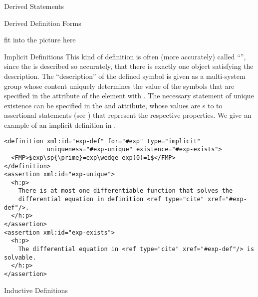 \begin{omgroup}{Derived Statements}
\begin{module}[id=derived-defs]
\begin{omgroup}[short=Derived Definitions]{Derived Definition Forms}
\begin{oldpart}{fit into the picture here}
\begin{module}[id=implicit-defs]
\begin{omgroup}{Implicit Definitions}
This kind of definition is often (more accurately) called ``{\emph{}}'', since the {} is described so accurately,
that there is exactly one object satisfying the description. The ``description'' of the
defined symbol is given as a multi-system  group whose content uniquely
determines the value of the symbols that are specified in the
 attribute of the  element with
 .  The necessary
statement of unique existence can be specified in the 
and  attribute, whose values are
{s} to to assertional statements (see
) that represent the respective properties.  We give
an example of an implicit definition in {}.

\begin{lstlisting}[label=lst:exp-def,mathescape,
  caption={An Implicit Definition of the Exponential Function},
  index={definition,assertion,type,uniqueness,existence}]
<definition xml:id="exp-def" for="#exp" type="implicit" 
            uniqueness="#exp-unique" existence="#exp-exists">
  <FMP>$exp\sp{\prime}=exp\wedge exp(0)=1$</FMP>
</definition>
<assertion xml:id="exp-unique">
  <h:p>
    There is at most one differentiable function that solves the 
    differential equation in definition <ref type="cite" xref="#exp-def"/>.
  </h:p>
</assertion>
<assertion xml:id="exp-exists">
  <h:p>
    The differential equation in <ref type="cite" xref="#exp-def"/> is solvable.
  </h:p>
</assertion>
\end{lstlisting}
\end{omgroup}
\end{module}

\begin{module}[id=inductive-defs]
\begin{omgroup}{Inductive Definitions}


\end{omgroup}
\end{module}
\end{oldpart}
\end{omgroup}
\end{module}
\end{omgroup}
